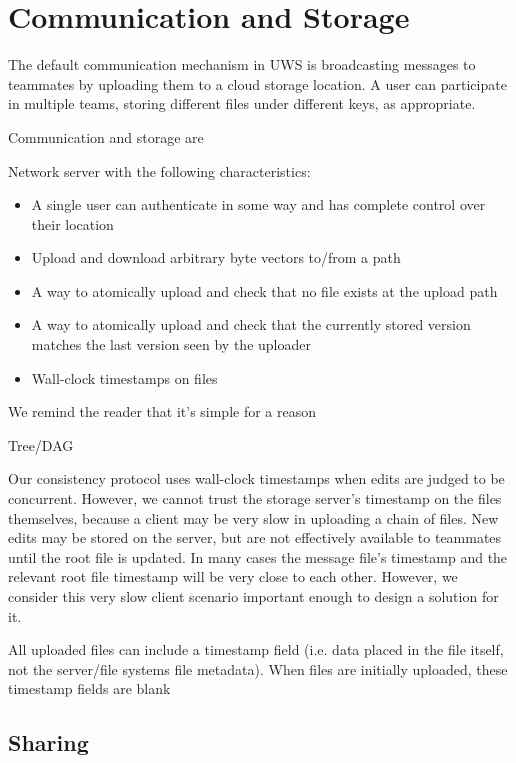 \documentclass{article}
\begin{document}
\section{Communication and Storage}

The default communication mechanism in UWS is broadcasting messages to teammates by uploading them to a cloud storage location.
A user can participate in multiple teams, storing different files under different keys, as appropriate.

Communication and storage are

Network server with the following characteristics:

\begin{itemize}
\item A single user can authenticate in some way and has complete control over their location
\item Upload and download arbitrary byte vectors to/from a path
\item A way to atomically upload and check that no file exists at the upload path
\item A way to atomically upload and check that the currently stored version matches the last version seen by the uploader
\item Wall-clock timestamps on files
\end{itemize}

We remind the reader that it's simple for a reason

Tree/DAG

Our consistency protocol uses wall-clock timestamps when edits are judged to be concurrent.
However, we cannot trust the storage server's timestamp on the files themselves, because a client may be very slow in uploading a chain of files.
New edits may be stored on the server, but are not effectively available to teammates until the root file is updated.
In many cases the message file's timestamp and the relevant root file timestamp will be very close to each other.
However, we consider this very slow client scenario important enough to design a solution for it.

All uploaded files can include a timestamp field (i.e. data placed in the file itself, not the server/file systems file metadata).
When files are initially uploaded, these timestamp fields are blank



\subsection{Sharing}
\end{document}
